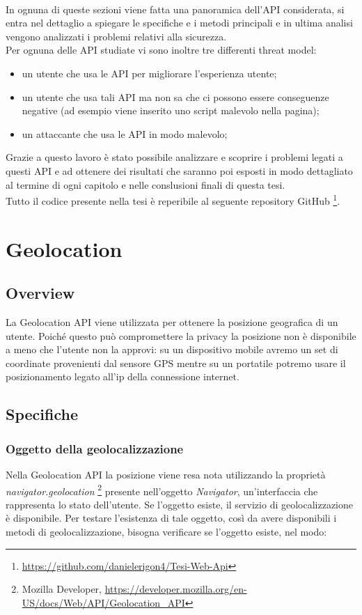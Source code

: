 \documentclass[11pt ,a4paper , twoside , openright ]{book}
\begin{document}
	\\
	In ognuna di queste sezioni viene fatta una panoramica dell'API considerata, si entra nel dettaglio a spiegare le specifiche e i metodi principali e in ultima analisi vengono analizzati i problemi relativi alla sicurezza.
	\\
	Per ognuna delle API studiate vi sono inoltre tre differenti threat model: 
	\begin{itemize}
		\item un utente che usa le API per migliorare l'esperienza utente;
		\item un utente che usa tali API ma non sa che ci possono essere conseguenze negative (ad esempio viene inserito uno script malevolo nella pagina);
		\item un attaccante che usa le API in modo malevolo;
	\end{itemize}
	Grazie a questo lavoro è stato possibile analizzare e scoprire i problemi legati a questi API e ad ottenere dei risultati che saranno poi esposti in modo dettagliato al termine di ogni capitolo e nelle conslusioni finali di questa tesi.
	\\
	Tutto il codice presente nella tesi è reperibile al seguente repository GitHub \footnote{\url{https://github.com/danielerigon4/Tesi-Web-Api}}.
	\cleardoublepage
	
	\chapter{Geolocation}
	\section{Overview}
	La Geolocation API viene utilizzata per ottenere la posizione geografica di un utente. 
	Poiché questo può compromettere la privacy la posizione non è disponibile a meno che l'utente non la approvi: su un dispositivo mobile avremo un set di coordinate provenienti dal sensore GPS mentre su un portatile potremo usare il posizionamento legato all’ip della connessione internet.
	\section{Specifiche}
	
	\subsection{Oggetto della geolocalizzazione}
	Nella Geolocation API la posizione viene resa nota utilizzando la proprietà \textit{navigator.geolocation} \footnote{Mozilla Developer, \url{https://developer.mozilla.org/en-US/docs/Web/API/Geolocation_API}} presente nell'oggetto \textit{Navigator}, un'interfaccia che rappresenta lo stato dell'utente. Se l'oggetto esiste, il servizio di geolocalizzazione è disponibile. Per testare l'esistenza di tale oggetto, così da avere disponibili i metodi di geolocalizzazione, bisogna verificare se l'oggetto esiste, nel modo:
	
	
\end{document}
